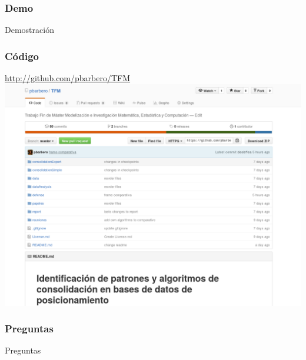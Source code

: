 \documentclass[10pt, spanish]{beamer}
\begin{document}

\begin{frame}[fragile]
\frametitle{Demo}
Demostraci\'on
\end{frame}

\begin{frame}[fragile]
	\frametitle{C\'odigo}
	\begin{center}
		\href{http://github.com/pbarbero/TFM}{http://github.com/pbarbero/TFM}
		\includegraphics[scale=.3]{github.png}
	\end{center}
\end{frame}

\begin{frame}[fragile]
\frametitle{Preguntas}
Preguntas
\end{frame}

\end{document}
